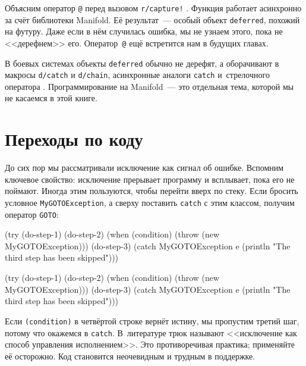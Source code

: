 
Объясним оператор \verb|@| перед вызовом \texttt{r/cap\-tu\-re!} .
Функция работает асинхронно за счёт библиотеки Manifold. Её результат~--- особый
объект \verb|deferred|, похожий на футуру. Даже если в нём случилась ошибка, мы
не узнаем этого, пока не <<дерефнем>> его. Оператор~\verb|@| ещё встретится нам
в будущих главах.

В боевых системах объекты \verb|deferred| обычно не дерефят, а оборачивают в
макросы \verb|d/catch| и \verb|d/chain|, асинхронные аналоги \verb|catch|
и~стрелочного оператора \arr{}. Программирование на Manifold~--- это
отдельная тема, которой мы не касаемся в этой книге.

\section{Переходы по коду}


До сих пор мы рассматривали исключение как сигнал об ошибке. Вспомним ключевое
свойство: исключение прерывает программу и всплывает, пока его не
поймают. Иногда этим пользуются, чтобы перейти вверх по стеку. Если бросить
условное \verb|MyGOTOException|, а сверху поставить \verb|catch| с этим
классом, получим оператор \verb|GOTO|:

\ifnarrow

\begin{english}
  \begin{clojure/lines}
(try
  (do-step-1)
  (do-step-2)
  (when (condition)
    (throw (new MyGOTOException)))
  (do-step-3)
  (catch MyGOTOException e
    (println "The third step
                  has been skipped")))
  \end{clojure/lines}
\end{english}

\else

\begin{english}
  \begin{clojure/lines}
(try
  (do-step-1)
  (do-step-2)
  (when (condition)
    (throw (new MyGOTOException)))
  (do-step-3)
  (catch MyGOTOException e
    (println "The third step has been skipped")))
  \end{clojure/lines}
\end{english}

\fi

Если \verb|(condition)| в четвёртой строке вернёт истину, мы пропустим третий
шаг, потому что окажемся в \verb|catch|. В~литературе трюк называют <<исключение
как способ управления исполнением>>. Это противоречивая практика; применяйте её
осторожно. Код становится неочевидным и трудным в поддержке.

